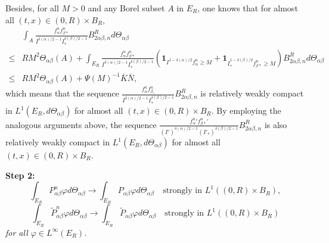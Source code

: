 \documentclass[reqno,11pt]{amsart}
\numberwithin{equation}{section}
\begin{document}
Besides, for all $M>0$ and any Borel subset $A$ in $E_R$, one knows that for almost all $(t,x) \in (0, R) \times B_R$,
\begin{equation*}
	\begin{aligned}
			& \int_{A}   \tfrac{f_\alpha^n f_{\beta *}^n}{ I^{\delta(\alpha) /2-1} I_*^{\delta(\beta)/2-1}} B^R_{2 \alpha \beta , n} d \Theta_{\alpha \beta}\\
		\leq& R M^2 \Theta_{\alpha \beta} (A) + \int_{E_R} \tfrac{f_\alpha^n f_{\beta *}^n}{ I^{\delta(\alpha) /2-1} I_*^{\delta(\beta)/2-1}} (\mathbf{1}_{I^{1-\delta(\alpha)/2} f_\alpha^n\geq M}+ \mathbf{1}_{I_*^{1-\delta(\beta) / 2} f_{\beta *}^n \geq M}) B^R_{2 \alpha \beta, n} d \Theta_{\alpha \beta}\\
		\leq & R M^2 \Theta_{\alpha \beta} (A)+\Psi(M)^{-1}\bar{K} \bar{N},
	\end{aligned}
\end{equation*}
which means that the sequence $  \frac{f^n_\alpha f^n_{\beta_* }}{I^{\delta(\alpha)/2-1} I_* ^{\delta(\beta)/2-1}} B^R_{2 \alpha \beta, n}$ is relatively weakly compact in $L^1(E_R,d \Theta_{\alpha \beta} )$ for almost all $(t,x) \in (0,R) \times   B_R$. By employing the analogous arguments above, the sequence  $  \frac{ {f_\alpha^n}' {f_{\beta *}^n}' }{(I')^{\delta(\alpha)/2-1} (I'_* )^{\delta(\beta)/2-1}} B^R_{2 \alpha \beta, n}$ is also relatively weakly compact in $L^1(E_R,d \Theta_{\alpha \beta} )$ for almost all $(t,x) \in (0,R) \times B_R$.





{\bf Step 2:} {\em 
\begin{equation}\label{P con}
\int_{E_R} P^n_{\alpha \beta}\varphi d \Theta_{\alpha \beta} \rightarrow \int_{E_R}  P_{\alpha \beta}\varphi d \Theta_{\alpha \beta} \quad \text{strongly in } L^1((0,R)\times B_R),
\end{equation}
\begin{equation}\label{til P con}
\int_{E_R}   \tilde{P}^n_{\alpha \beta}\varphi d\Theta_{\alpha \beta} \rightarrow \int_{E_R}  \tilde{P}_{\alpha \beta}\varphi d \Theta_{\alpha \beta} \quad \text{strongly in } L^1((0,R)\times B_R)
\end{equation}
for all $\varphi \in L^\infty (E_R)$.}
\end{document}
